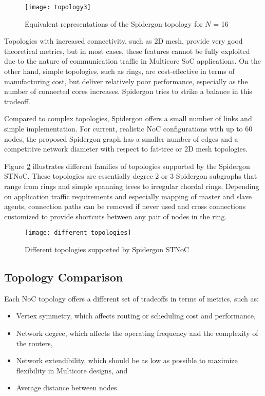 	\begin{figure}[ht]
	\centering
		\texttt{[image: topology3]}
		\caption{Equivalent representations of the Spidergon topology for ${N}$ = 16}
		\label{fig:topology}
	\end{figure}

Topologies with increased connectivity, such as 2D mesh, provide very good theoretical metrics, but in most cases, these features cannot be fully exploited due to the nature of communication traffic in Multicore SoC applications. 
On the other hand, simple topologies, such as rings, are cost-effective in terms of manufacturing cost, but deliver relatively poor performance, especially as the number of connected cores increases. Spidergon tries to strike a balance in this tradeoff. 

Compared to complex topologies, Spidergon offers a small number of links and simple implementation. For current, realistic NoC configurations with up to 60 nodes, the proposed Spidergon graph has a smaller number of edges and a competitive network diameter with respect to fat-tree or 2D mesh topologies.

Figure \ref{fig:different_topologies} illustrates different families of topologies supported by the Spidergon STNoC. 
These topologies are essentially degree 2 or 3 Spidergon subgraphs that range from rings and simple spanning trees to irregular chordal rings. 
Depending on application traffic requirements and especially mapping of master and slave agents, connection paths can be removed if never used and cross connections customized to provide shortcuts between any pair of nodes in the ring.

	\begin{figure}[ht]
	\centering
		\texttt{[image: different\_topologies]}
		\caption{Different topologies supported by Spidergon STNoC}
		\label{fig:different_topologies}
	\end{figure}

\subsection{Topology Comparison}\label{S:metrics}

Each NoC topology offers a different set of tradeoffs in terms of metrics, such as:
\begin{itemize}
\item Vertex symmetry, which affects routing or scheduling cost and performance,
\item Network degree, which affects the operating frequency and the complexity of the routers,
\item Network extendibility, which should be as low as possible to maximize flexibility in Multicore designs, and 
\item Average distance between nodes.
\end{itemize}

